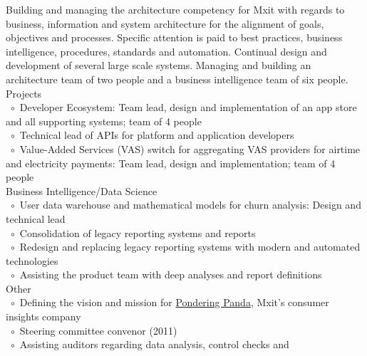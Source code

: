 \documentclass[10pt,a4paper,final]{columncv}
\newcommand{\cvitembullet}{~$\circ$~}
\newcommand{\cvitempbullet}{\phantom{\cvitembullet}}
\begin{document}
\begin{cvenv}
  \cvitem{}{} %
  
         {Building and managing the architecture competency for Mxit with regards to 
         business, information and system architecture for the alignment of goals, 
         objectives and processes. Specific attention is paid to best practices, business 
         intelligence, procedures, standards and automation. Continual design and 
         development of several large scale systems. Managing and building an architecture
         team of two people and a business intelligence team of six people.}
         {Projects \\
         \cvitembullet Developer Ecosystem: Team lead, design and implementation 
         \cvitempbullet of an app store and all supporting systems; team of 4 people \\
         \cvitembullet Technical lead of APIs for platform and application developers \\
         \cvitembullet Value-Added Services (VAS) switch for aggregating VAS providers 
         \cvitempbullet for airtime and electricity payments: Team lead, design and 
         \cvitempbullet implementation; team of 4 people \\
         Business Intelligence/Data Science \\
         \cvitembullet User data warehouse and mathematical models for churn analysis: 
         \cvitempbullet Design and technical lead \\
         \cvitembullet Consolidation of legacy reporting systems and reports \\
         \cvitembullet Redesign and replacing legacy reporting systems with modern and 
         \cvitempbullet automated technologies \\
         \cvitembullet Assisting the product team with deep analyses and report 
         \cvitempbullet definitions \\
         Other \\
         \cvitembullet Defining the vision and mission for \href{http://www.ponderingpanda.com/}{Pondering Panda}, Mxit's
         \cvitempbullet consumer insights company \\
         \cvitembullet Steering committee convenor (2011) \\
         \cvitembullet Assisting auditors regarding data analysis, control checks and 
}
\end{cvenv}
\end{document}
